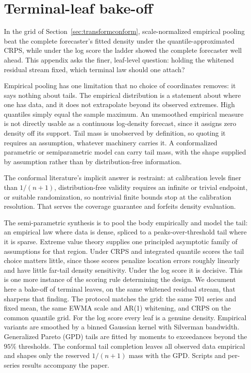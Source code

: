 \documentclass[11pt]{article}
\theoremstyle{remark}
\begin{document}
\appendix

\section{Terminal-leaf bake-off}\label{app:bakeoff}

In the grid of Section~\ref{sec:transformconform}, scale-normalized empirical pooling beat
the complete forecaster's fitted density under the quantile-approximated CRPS, while under
the log score the ladder showed the complete forecaster well ahead. This appendix asks the finer,
leaf-level question: holding the whitened residual stream fixed, which terminal law should
one attach?

Empirical pooling has one limitation that no choice of coordinates removes: it says nothing
about tails. The empirical distribution is a statement about where one has data, and it does
not extrapolate beyond its observed extremes. High quantiles simply equal the sample maximum. An
unsmoothed empirical measure is not directly usable as a continuous log-density forecast,
since it assigns zero density off its support. Tail mass is unobserved by definition, so
quoting it requires an assumption, whatever machinery carries it. A conformalized parametric
or semiparametric model can carry tail mass, with the shape supplied by assumption rather
than by distribution-free information.

The conformal literature's implicit answer is restraint: at calibration levels finer than
$1/(n{+}1)$, distribution-free validity requires an infinite or trivial endpoint, or suitable
randomization, so nontrivial finite bounds stop at the calibration resolution. That serves the coverage guarantee and forfeits density evaluation.

The semi-parametric synthesis is to pool the body empirically and model the tail: an
empirical law where data is dense, spliced to a peaks-over-threshold tail where it is sparse.
Extreme value theory supplies one principled asymptotic family of assumptions for that
region. Under CRPS and integrated quantile scores the tail choice matters little, since those
scores penalize location errors roughly linearly and have little far-tail density
sensitivity. Under the log score it is decisive. This is one more instance of the scoring rule determining the design. We document here a bake-off of terminal leaves, on the same whitened residual stream, that
sharpens that finding.
The protocol matches the grid: the same 701 series and fixed mean, the same EWMA scale and
AR(1) whitening, and CRPS on the common quantile grid. For the log score every leaf is a
genuine density. Empirical variants are smoothed by a binned Gaussian kernel with Silverman
bandwidth. Generalized Pareto (GPD) tails are fitted by moments to exceedances beyond the
$95\%$ thresholds. The conformal tail completion leaves all observed data empirical and
shapes only the reserved $1/(n{+}1)$ mass with the GPD. Scripts and per-series results accompany the paper.
\end{document}
